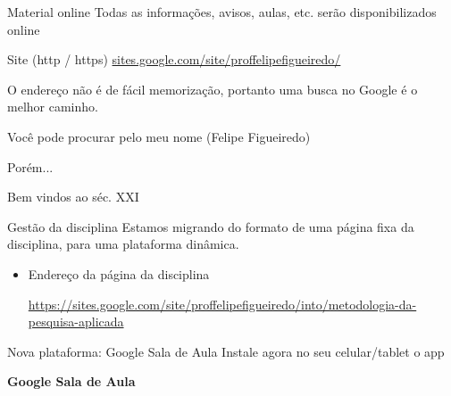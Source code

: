 \documentclass{beamer}
\begin{document}
\begin{frame}{Material online}
  Todas as informações, avisos, aulas, etc. serão disponibilizados online
  \begin{block}{Site (http / https)}
    \small
    \url{sites.google.com/site/proffelipefigueiredo/}
  \end{block}

  \bigskip
  O endereço não é de fácil memorização, portanto uma busca no Google é o melhor caminho.

  \bigskip
  Você pode procurar pelo meu nome (Felipe Figueiredo)

  \bigskip
  \bigskip
  Porém...
\end{frame}

\begin{frame}{Bem vindos ao séc. XXI}
  \begin{block}{Gestão da disciplina}
    Estamos migrando do formato de uma página fixa da disciplina, para uma plataforma dinâmica.
  \end{block}
  \begin{itemize}
  \item Endereço da página da disciplina

    \url{https://sites.google.com/site/proffelipefigueiredo/into/metodologia-da-pesquisa-aplicada}
  \end{itemize}
  \begin{block}{Nova plataforma: Google Sala de Aula}
    Instale agora no seu celular/tablet o app

    \bigskip
    {\bf Google Sala de Aula}
  \end{block}
\end{frame}
\end{document}

